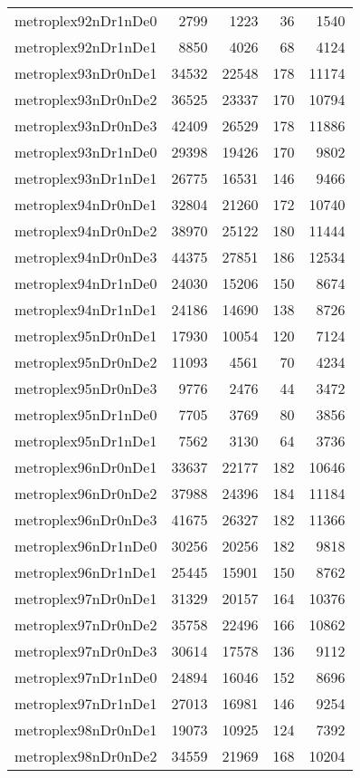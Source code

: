 \begin{longtable}{lrrrr}
metroplex92nDr1nDe0 & 2799 & 1223 & 36 & 1540 \\
metroplex92nDr1nDe1 & 8850 & 4026 & 68 & 4124 \\
metroplex93nDr0nDe1 & 34532 & 22548 & 178 & 11174 \\
metroplex93nDr0nDe2 & 36525 & 23337 & 170 & 10794 \\
metroplex93nDr0nDe3 & 42409 & 26529 & 178 & 11886 \\
metroplex93nDr1nDe0 & 29398 & 19426 & 170 & 9802 \\
metroplex93nDr1nDe1 & 26775 & 16531 & 146 & 9466 \\
metroplex94nDr0nDe1 & 32804 & 21260 & 172 & 10740 \\
metroplex94nDr0nDe2 & 38970 & 25122 & 180 & 11444 \\
metroplex94nDr0nDe3 & 44375 & 27851 & 186 & 12534 \\
metroplex94nDr1nDe0 & 24030 & 15206 & 150 & 8674 \\
metroplex94nDr1nDe1 & 24186 & 14690 & 138 & 8726 \\
metroplex95nDr0nDe1 & 17930 & 10054 & 120 & 7124 \\
metroplex95nDr0nDe2 & 11093 & 4561 & 70 & 4234 \\
metroplex95nDr0nDe3 & 9776 & 2476 & 44 & 3472 \\
metroplex95nDr1nDe0 & 7705 & 3769 & 80 & 3856 \\
metroplex95nDr1nDe1 & 7562 & 3130 & 64 & 3736 \\
metroplex96nDr0nDe1 & 33637 & 22177 & 182 & 10646 \\
metroplex96nDr0nDe2 & 37988 & 24396 & 184 & 11184 \\
metroplex96nDr0nDe3 & 41675 & 26327 & 182 & 11366 \\
metroplex96nDr1nDe0 & 30256 & 20256 & 182 & 9818 \\
metroplex96nDr1nDe1 & 25445 & 15901 & 150 & 8762 \\
metroplex97nDr0nDe1 & 31329 & 20157 & 164 & 10376 \\
metroplex97nDr0nDe2 & 35758 & 22496 & 166 & 10862 \\
metroplex97nDr0nDe3 & 30614 & 17578 & 136 & 9112 \\
metroplex97nDr1nDe0 & 24894 & 16046 & 152 & 8696 \\
metroplex97nDr1nDe1 & 27013 & 16981 & 146 & 9254 \\
metroplex98nDr0nDe1 & 19073 & 10925 & 124 & 7392 \\
metroplex98nDr0nDe2 & 34559 & 21969 & 168 & 10204 \\

\end{longtable}
